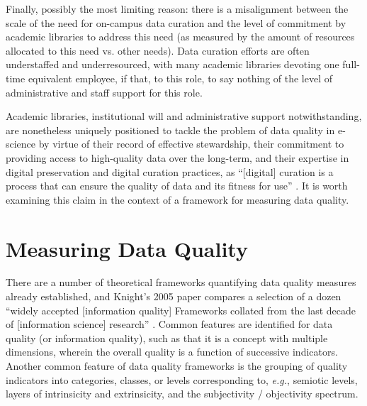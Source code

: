\documentclass[man,12pt,biblatex]{apa6}
\begin{document}
Finally, possibly the most limiting reason: there is a misalignment
between the scale of the need for on-campus data curation and the
level of commitment by academic libraries to address this need (as
measured by the amount of resources allocated to this need vs. other
needs). Data curation efforts are often understaffed and
underresourced, with many academic libraries devoting one full-time
equivalent employee, if that, to this role, to say nothing of the
level of administrative and staff support for this role.

Academic libraries, institutional will and administrative support
notwithstanding, are nonetheless uniquely positioned to tackle the
problem of data quality in e-science by virtue of their record of
effective stewardship, their commitment to providing access to
high-quality data over the long-term, and their expertise in digital
preservation and digital curation practices, as ``[digital] curation
is a process that can ensure the quality of data and its fitness for
use'' \parencite{curry:community}. It is worth examining this claim in the
context of a framework for measuring data quality.

%
%

\section{Measuring Data Quality}
There are a number of theoretical frameworks quantifying data quality
measures already established, and Knight's 2005 paper compares a
selection of a dozen ``widely accepted [information quality]
Frameworks collated from the last decade of [information science]
research'' \parencite{knight:quality}. Common features are identified for
data quality (or information quality), such as that it is a concept
with multiple dimensions, wherein the overall quality is a function of
successive indicators.  Another common feature of data quality
frameworks is the grouping of quality indicators into categories,
classes, or levels corresponding to, \textit{e.g.}, semiotic levels,
layers of intrinsicity and extrinsicity, and the subjectivity /
objectivity spectrum.
\end{document}
